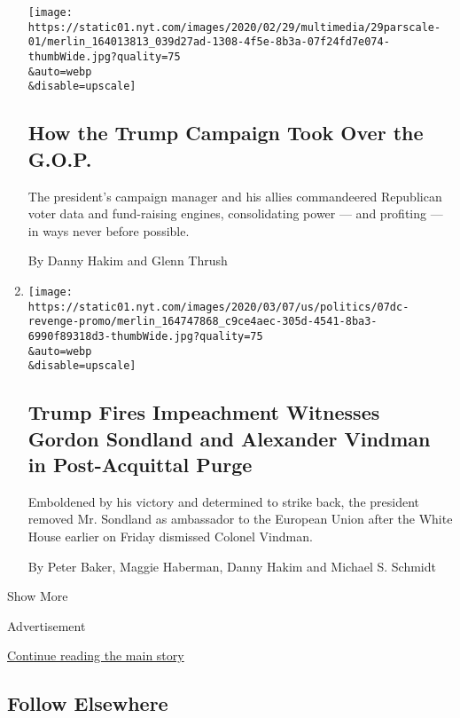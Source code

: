 \begin{enumerate}
  \texttt{[image: https://static01.nyt.com/images/2020/02/29/multimedia/29parscale-01/merlin\_164013813\_039d27ad-1308-4f5e-8b3a-07f24fd7e074-thumbWide.jpg?quality=75\\\&auto=webp\\\&disable=upscale]}

  \hypertarget{how-the-trump-campaign-took-over-the-gop}{%
  \subsection{How the Trump Campaign Took Over the
  G.O.P.}\label{how-the-trump-campaign-took-over-the-gop}}

  The president's campaign manager and his allies commandeered
  Republican voter data and fund-raising engines, consolidating power
  --- and profiting --- in ways never before possible.

  By Danny Hakim and Glenn Thrush
\item
  \href{/2020/02/07/us/politics/alexander-vindman-gordon-sondland-fired.html}{}

  \texttt{[image: https://static01.nyt.com/images/2020/03/07/us/politics/07dc-revenge-promo/merlin\_164747868\_c9ce4aec-305d-4541-8ba3-6990f89318d3-thumbWide.jpg?quality=75\\\&auto=webp\\\&disable=upscale]}

  \hypertarget{trump-fires-impeachment-witnesses-gordon-sondland-and-alexander-vindman-in-post-acquittal-purge}{%
  \subsection{Trump Fires Impeachment Witnesses Gordon Sondland and
  Alexander Vindman in Post-Acquittal
  Purge}\label{trump-fires-impeachment-witnesses-gordon-sondland-and-alexander-vindman-in-post-acquittal-purge}}

  Emboldened by his victory and determined to strike back, the president
  removed Mr. Sondland as ambassador to the European Union after the
  White House earlier on Friday dismissed Colonel Vindman.

  By Peter Baker, Maggie Haberman, Danny Hakim and Michael S. Schmidt
\end{enumerate}

Show More

Advertisement

\protect\hyperlink{after-mid2}{Continue reading the main story}

\hypertarget{follow-elsewhere}{%
\subsection{Follow Elsewhere}\label{follow-elsewhere}}

